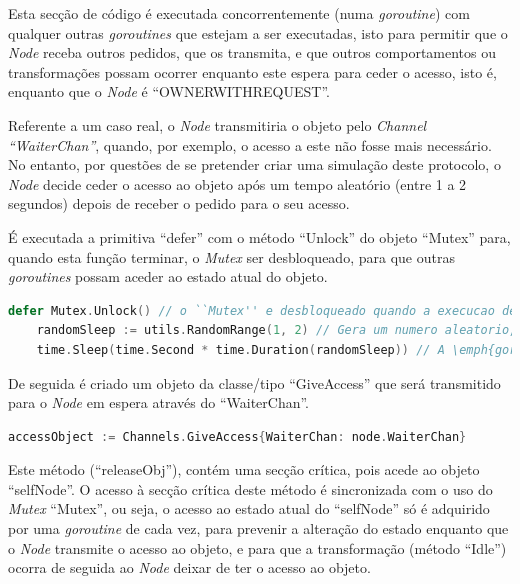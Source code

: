 Esta secção de código é executada concorrentemente (numa \emph{goroutine}) com qualquer outras \emph{goroutines} 
que estejam a ser executadas,
isto para permitir que o \emph{Node} receba outros pedidos,
que os transmita, e que outros comportamentos ou transformações possam ocorrer 
enquanto este espera para ceder o acesso, isto é, enquanto que o \emph{Node} é ``OWNER\textunderscore WITH\textunderscore REQUEST''.


Referente a um caso real, o \emph{Node} transmitiria o objeto pelo \emph{Channel ``WaiterChan''}, quando, por exemplo, 
o acesso a este não fosse mais necessário.
No entanto, por questões de se pretender criar uma simulação deste protocolo, o \emph{Node} decide ceder o acesso ao objeto após um tempo aleatório (entre 1 a 2 segundos)
depois de receber o pedido para o seu acesso.

É executada a primitiva ``defer'' com o método ``Unlock'' do objeto ``Mutex'' para,
quando esta função terminar, o \emph{Mutex} ser desbloqueado, para que outras \emph{goroutines}
possam aceder ao estado atual do objeto.

\begin{lstlisting}[caption={\emph{Node} espera 1 ou 2 segundos antes de ceder o objeto.},language=Go]
	defer Mutex.Unlock() // o ``Mutex'' e desbloqueado quando a execucao deste metodo terminar
	randomSleep := utils.RandomRange(1, 2) // Gera um numero aleatorio, neste caso, 1 ou 2
	time.Sleep(time.Second * time.Duration(randomSleep)) // A \emph{goroutine} espera durante o tempo aleatorio gerado (em segundos)
\end{lstlisting}

De seguida é criado um objeto da classe/tipo ``GiveAccess'' que será transmitido para o \emph{Node} em espera 
através do ``WaiterChan''.

\begin{lstlisting}[caption={Criação do objeto ``accessObject'', da classe ``GiveAccess''},language=Go]
	accessObject := Channels.GiveAccess{WaiterChan: node.WaiterChan}
\end{lstlisting}


Este método (``releaseObj''), contém uma secção crítica,
pois acede ao objeto ``selfNode''. 
O acesso à secção crítica deste método é sincronizada com o uso do \emph{Mutex} ``Mutex'', ou seja,
o acesso ao estado atual do ``selfNode'' só é adquirido por uma \emph{goroutine} de cada vez, para prevenir a alteração do estado
enquanto que o \emph{Node} transmite o acesso ao objeto, 
e para que a transformação (método ``Idle'') ocorra de seguida ao \emph{Node} deixar de ter o acesso ao objeto.

